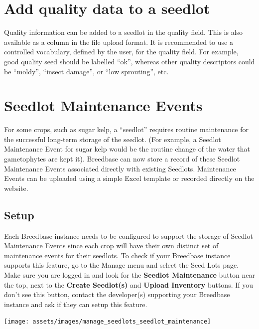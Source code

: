 \documentclass[
  12pt,
]{book}
\begin{document}
\hypertarget{add-quality-data-to-a-seedlot}{%
\section{Add quality data to a seedlot}\label{add-quality-data-to-a-seedlot}}

Quality information can be added to a seedlot in the quality field. This is also available as a column in the file upload format. It is recommended to use a controlled vocabulary, defined by the user, for the quality field. For example, good quality seed should be labelled ``ok'', whereas other quality descriptors could be ``moldy'', ``insect damage'', or ``low sprouting'', etc.

\hypertarget{seedlot-maintenance-events}{%
\section{Seedlot Maintenance Events}\label{seedlot-maintenance-events}}

For some crops, such as sugar kelp, a ``seedlot'' requires routine maintenance for the successful long-term storage of the seedlot. (For example, a Seedlot Maintenance Event for sugar kelp would be the routine change of the water that gametophytes are kept it). Breedbase can now store a record of these Seedlot Maintenance Events associated directly with existing Seedlots. Maintenance Events can be uploaded using a simple Excel template or recorded directly on the website.

\hypertarget{setup}{%
\subsection{Setup}\label{setup}}

Each Breedbase instance needs to be configured to support the storage of Seedlot Maintenance Events since each crop will have their own distinct set of maintenance events for their seedlots. To check if your Breedbase instance supports this feature, go to the Manage menu and select the Seed Lots page. Make sure you are logged in and look for the \textbf{Seedlot Maintenance} button near the top, next to the \textbf{Create Seedlot(s)} and \textbf{Upload Inventory} buttons. If you don't see this button, contact the developer(s) supporting your Breedbase instance and ask if they can setup this feature.

\begin{center}\texttt{[image: assets/images/manage\_seedlots\_seedlot\_maintenance]} \end{center}
\end{document}
